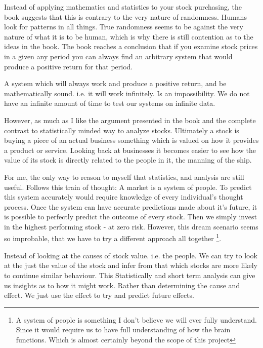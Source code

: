 \documentclass[12pt]{article}
\begin{document}
    Instead of applying mathematics and statistics to your stock purchasing, the book
    suggests that this is contrary to the 
    very nature of randomness. Humans look for patterns in all things. True 
    randomness seems to be against the very nature of what it is to be human, which is why
    there is still contention as to the ideas in the book. The book reaches a conclusion that
    if you examine stock prices in a given any period you can always find an arbitrary
    system that would produce a positive return for that period.

    A system which will always work and produce a positive return, and be mathematically sound.
    i.e. it will work infinitely. Is an impossibility. We do not have an infinite amount of
    time to test our systems on infinite data.

    However, as much as I like the argument presented in the book and the complete contrast to
    statistically minded way to analyze stocks. Ultimately a stock is buying a piece of an
    actual business something which is valued on how it provides a product or service.
    Looking back at businesses it becomes easier to see how the value of its stock is directly
    related to the people in it, the manning of the ship.

    For me, the only way to reason to myself that statistics, and analysis are still 
    useful. Follows this train of thought: A market is a system of people.
    To predict this system accurately would require knowledge of every individual's
    thought process. Once the system can have accurate predictions made about it's
    future, it is possible to perfectly predict the outcome of every stock. Then
    we simply invest in the highest performing stock - at zero risk. However, this
    dream scenario seems so improbable, that we have to try a different approach
    all together
    \footnote{A system of people is something I don't believe we will ever fully understand.
    Since it would require us to have full understanding of how the brain functions. Which
    is almost certainly beyond the scope of this project}.

    Instead of looking at the causes of stock value. i.e. the people. We can try to look
    at the just the value of the stock and infer from that which stocks are more
    likely to continue similar behaviour. This 
    Statistically and short term analysis can give us insights as to 
    how it might work. Rather than determining the cause and effect. We just use the effect
    to try and predict future effects.
\end{document}
